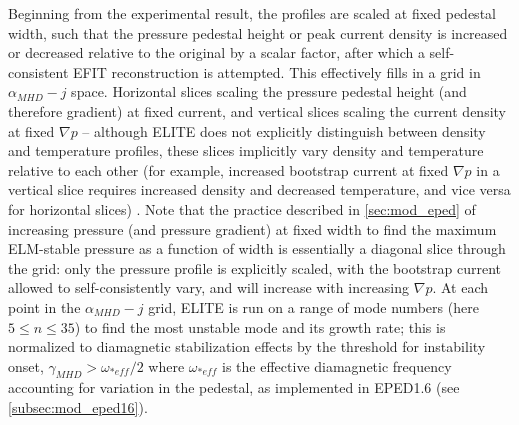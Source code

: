 Beginning from the experimental result, the profiles are scaled at fixed pedestal width, such that the pressure pedestal height or peak current density is increased or decreased relative to the original by a scalar factor, after which a self-consistent EFIT reconstruction is attempted.  This effectively fills in a grid in $\alpha_{MHD} - j$ space.  Horizontal slices scaling the pressure pedestal height (and therefore gradient) at fixed current, and vertical slices scaling the current density at fixed $\nabla p$ -- although ELITE does not explicitly distinguish between density and temperature profiles, these slices implicitly vary density and temperature relative to each other (for example, increased bootstrap current at fixed $\nabla p$ in a vertical slice requires increased density and decreased temperature, and vice versa for horizontal slices) \cite{Snyder2013}.  Note that the practice described in \cref{sec:mod_eped} of increasing pressure (and pressure gradient) at fixed width to find the maximum ELM-stable pressure as a function of width is essentially a diagonal slice through the grid: only the pressure profile is explicitly scaled, with the bootstrap current allowed to self-consistently vary, and will increase with increasing $\nabla p$.  At each point in the $\alpha_{MHD} - j$ grid, ELITE is run on a range of mode numbers (here $5 \le n \le 35$) to find the most unstable mode and its growth rate; this is normalized to diamagnetic stabilization effects by the threshold for instability onset, $\gamma_{MHD} > \omega_{*eff}/2$ where $\omega_{*eff}$ is the effective diamagnetic frequency accounting for variation in the pedestal, as implemented in EPED1.6 (see \cref{subsec:mod_eped16}).

